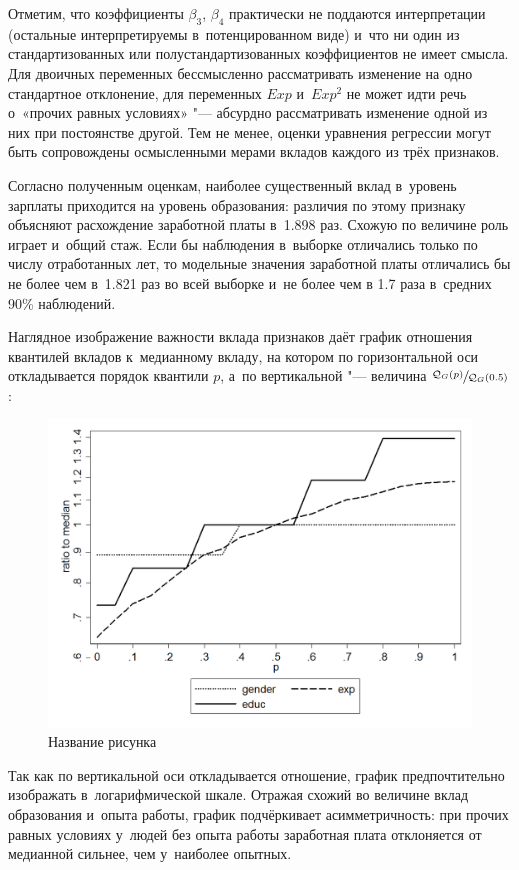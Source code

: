 \documentclass[11pt]{article}
\begin{document}
Отметим, что коэффициенты $\beta_3$, $\beta_4$ практически не поддаются интерпретации (остальные интерпретируемы в~потенцированном виде) и~что ни один из стандартизованных или полустандартизованных коэффициентов не имеет смысла. Для двоичных переменных бессмысленно рассматривать изменение на одно стандартное отклонение, для переменных $Exp$ и~$Exp^2$ не может идти речь о~«прочих равных условиях» "--- абсурдно рассматривать изменение одной из них при постоянстве другой. Тем не менее, оценки уравнения регрессии могут быть сопровождены осмысленными мерами вкладов каждого из трёх признаков.

Согласно полученным оценкам, наиболее существенный вклад в~уровень зарплаты приходится на уровень образования: различия по этому признаку объясняют расхождение заработной платы в~1.898 раз. Схожую по величине роль играет и~общий стаж. Если бы наблюдения в~выборке отличались только по числу отработанных лет, то модельные значения заработной платы отличались бы не более чем в~1.821 раз во всей выборке и~не более чем в 1.7 раза в~средних 90\% наблюдений.

Наглядное изображение важности вклада признаков даёт график отношения квантилей вкладов к~медианному вкладу, на котором по горизонтальной оси откладывается порядок квантили $p$, а~по вертикальной "--- величина $\sfrac{\mathcal{Q}_G(p)}{\mathcal{Q}_G(0.5)}$:

\begin{figure}[htbp]
	\centering
	\includegraphics[width=12cm]{wageeq.png}
	\caption{Название рисунка}\label{fig:wageeq}
\end{figure}

Так как по вертикальной оси откладывается отношение, график предпочтительно изображать в~логарифмической шкале. Отражая схожий во величине вклад образования и~опыта работы, график подчёркивает асимметричность: при прочих равных условиях у~людей без опыта работы заработная плата отклоняется от медианной сильнее, чем у~наиболее опытных.
\end{document}
